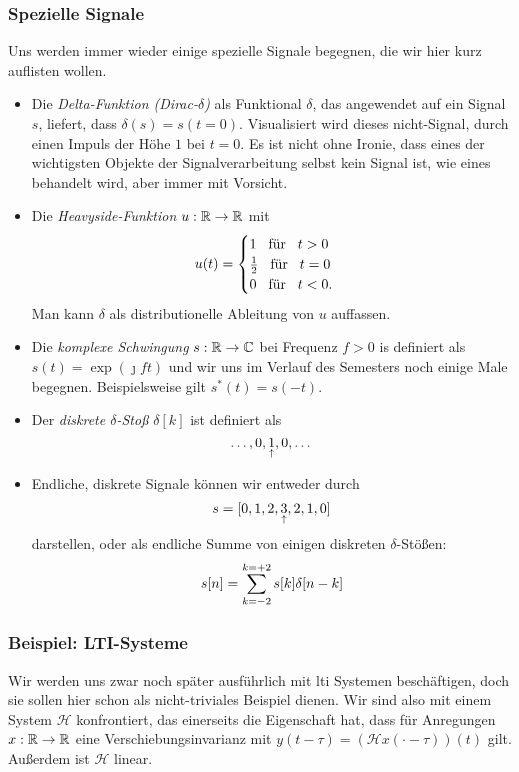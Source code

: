 \subsubsection{Spezielle Signale}
%
Uns werden immer wieder einige spezielle Signale begegnen, die wir hier kurz auflisten wollen.
\begin{itemize}
    \item Die \emph{Delta-Funktion (Dirac-$\delta$)} als Funktional $\delta$, das angewendet auf ein Signal $s$, liefert, dass $\delta(s) = s(t = 0)$. Visualisiert wird dieses nicht-Signal, durch einen Impuls der H\"ohe $1$ bei $t = 0$. Es ist nicht ohne Ironie, dass eines der wichtigsten Objekte der Signalverarbeitung selbst kein Signal ist, wie eines behandelt wird, aber immer mit Vorsicht.
    \item Die \emph{Heavyside-Funktion} $u : \mathbb{R} \rightarrow \mathbb{R}$ mit
    \[
        u(t) = \begin{cases}
            1 {\hspace{3mm} \text{f\"ur} \hspace{3mm}} t>0 \\
            \frac{1}{2} {\hspace{3mm} \text{f\"ur} \hspace{3mm}} t = 0 \\
            0 {\hspace{3mm} \text{f\"ur} \hspace{3mm}} t < 0.
        \end{cases}
    \]
    Man kann $\delta$ als distributionelle Ableitung von $u$ auffassen.
    \item Die \emph{komplexe Schwingung} $s : \mathbb{R} \rightarrow \mathbb{C}$ bei Frequenz $f > 0$ is definiert als 
        $s(t) = \exp(\jmath f t)$
    und wir uns im Verlauf des Semesters noch einige Male begegnen. Beispielsweise gilt $s^\ast(t) = s(-t)$.
    \item Der \emph{diskrete $\delta$-Sto\ss{}} $\delta[k]$ ist definiert als
    \[\dots, 0, \underset{\uparrow}{1}, 0, \dots\]
    \item Endliche, diskrete Signale k\"onnen wir entweder durch
    \[
        s = [0,1,2,\underset{\uparrow}{3},2,1,0]
    \]
    darstellen, oder als endliche Summe von einigen diskreten $\delta$-St\"o\ss{}en:
    \[
        s[n] = {\sum\limits_{k=-2}^{k=+2}{s}}[k] \delta[n - k]
    \]
\end{itemize}
%
%
\subsubsection{Beispiel: LTI-Systeme}
Wir werden uns zwar noch sp\"ater ausf\"uhrlich mit \gls{lti} Systemen besch\"aftigen, doch sie sollen hier schon als nicht-triviales Beispiel dienen.
Wir sind also mit einem System $\mathcal{H}$ konfrontiert, das einerseits die Eigenschaft hat, dass 
f\"ur Anregungen $x : \mathbb{R} \rightarrow \mathbb{R}$ eine Verschiebungsinvarianz mit $y(t - \tau) = (\mathcal{H}x(\cdot  - \tau))(t)$ gilt. Au\ss{}erdem ist $\mathcal{H}$ linear.

